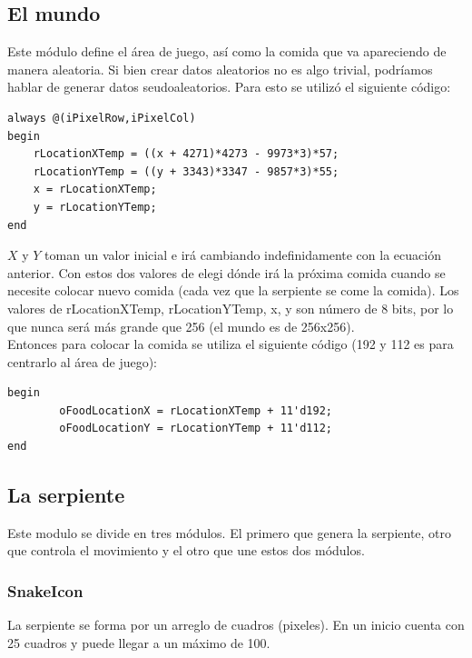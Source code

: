 \documentclass[10pt]{article}
\begin{document}
\subsection{El mundo}

Este módulo define el área de juego, así como la comida que va apareciendo de manera aleatoria. Si bien crear datos aleatorios no es algo trivial, podríamos hablar de generar datos seudoaleatorios. Para esto se utilizó el siguiente código:

\begin{lstlisting}
always @(iPixelRow,iPixelCol) 
begin		
	rLocationXTemp = ((x + 4271)*4273 - 9973*3)*57;
	rLocationYTemp = ((y + 3343)*3347 - 9857*3)*55;
	x = rLocationXTemp;
	y = rLocationYTemp;
end
\end{lstlisting}

$X$ y $Y$ toman un valor inicial e irá cambiando indefinidamente con la ecuación anterior. Con estos dos valores de elegi dónde irá la próxima comida cuando se necesite colocar nuevo comida (cada vez que la serpiente se come la comida). Los valores de rLocationXTemp, rLocationYTemp, x, y son número de 8 bits, por lo que nunca será más grande que 256 (el mundo es de 256x256).\\

Entonces para colocar la comida se utiliza el siguiente código (192 y 112 es para centrarlo al área de juego):

\begin{lstlisting}
begin
		oFoodLocationX = rLocationXTemp + 11'd192;
		oFoodLocationY = rLocationYTemp + 11'd112;
end
\end{lstlisting}

\subsection{La serpiente}

Este modulo se divide en tres módulos. El primero que genera la serpiente, otro que controla el movimiento y el otro que une estos dos módulos.

\subsubsection{SnakeIcon}

La serpiente se forma por un arreglo de cuadros (pixeles). En un inicio cuenta con 25 cuadros y puede llegar a un máximo de 100.\\
\end{document}
